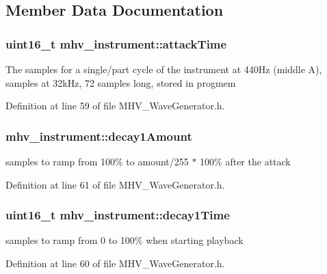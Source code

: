 \subsection{Member Data Documentation}
\hypertarget{structmhv__instrument_a9b85066674551959ac0ef4d57bedfcb5}{
\subsubsection[{attack\-Time}]{\setlength{\rightskip}{0pt plus 5cm}uint16\-\_\-t mhv\-\_\-instrument\-::attack\-Time}}\label{structmhv__instrument_a9b85066674551959ac0ef4d57bedfcb5}
The samples for a single/part cycle of the instrument at 440\-Hz (middle A), samples at 32k\-Hz, 72 samples long, stored in progmem 

Definition at line 59 of file M\-H\-V\-\_\-\-Wave\-Generator.\-h.

\hypertarget{structmhv__instrument_a922f4e32b9e9c1b7e685124845fed1ad}{
\subsubsection[{decay1\-Amount}]{ mhv\-\_\-instrument\-::decay1\-Amount}}\label{structmhv__instrument_a922f4e32b9e9c1b7e685124845fed1ad}
samples to ramp from 100\% to amount/255 $\ast$ 100\% after the attack 

Definition at line 61 of file M\-H\-V\-\_\-\-Wave\-Generator.\-h.

\hypertarget{structmhv__instrument_a8ba9f75ad91b531d497d18bad6351d9d}{
\subsubsection[{decay1\-Time}]{\setlength{\rightskip}{0pt plus 5cm}uint16\-\_\-t mhv\-\_\-instrument\-::decay1\-Time}}\label{structmhv__instrument_a8ba9f75ad91b531d497d18bad6351d9d}
samples to ramp from 0 to 100\% when starting playback 

Definition at line 60 of file M\-H\-V\-\_\-\-Wave\-Generator.\-h.

